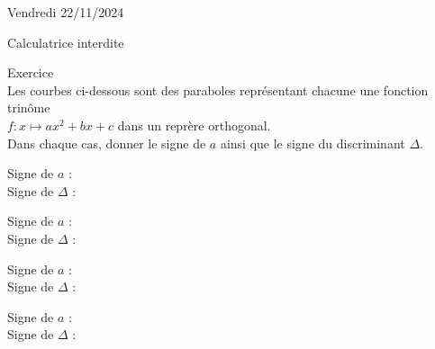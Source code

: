 \documentclass[a4paper,11pt,eval]{nsi}
\newcounter{exoNum}
\newcommand{\exo}[1]
{
	\addtocounter{exoNum}{1}
	{\titlefont\color{UGLiBlue}\Large Exercice\ \theexoNum\ \normalsize{#1}}\smallskip	
}
\begin{document}
\textcolor{UGLiBlue}{Vendredi 22/11/2024}\\
\maketitle
\begin{center}
	Calculatrice interdite
\end{center}

\vspace{.5cm}

\exo{}\\
Les courbes ci-dessous sont des paraboles représentant chacune une fonction trinôme\\ $f:x\mapsto ax^2+bx+c$ dans un reprère orthogonal.\\[.5em]
Dans chaque cas, donner le signe de $a$ ainsi que le signe du discriminant $\Delta$.\\

{
    \begin{enumalph}
        \item Signe de $a$ : \dotfill\\[1em]
            Signe de $\Delta$ : \dotfill\\
        \item Signe de $a$ : \dotfill\\[1em]
            Signe de $\Delta$ : \dotfill\\
        \item Signe de $a$ : \dotfill\\[1em]
            Signe de $\Delta$ : \dotfill\\
        \item Signe de $a$ : \dotfill\\[1em]
            Signe de $\Delta$ : \dotfill
    \end{enumalph}
}
\end{document}
